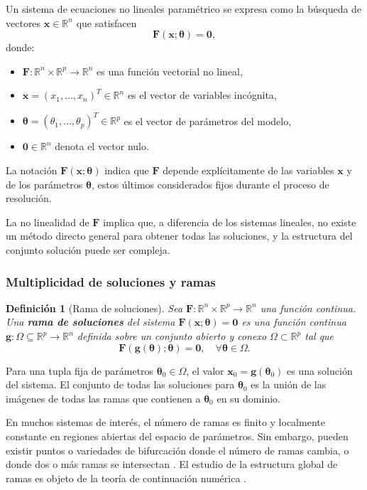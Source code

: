 \documentclass[12pt,a4paper]{article}
\newtheorem{definition}{Definición}
\newcommand{\xvec}{\mathbf{x}}
\newcommand{\thetavec}{\boldsymbol{\theta}}
\newcommand{\Fvec}{\mathbf{F}}
\newcommand{\R}{\mathbb{R}}
\begin{document}
Un sistema de ecuaciones no lineales paramétrico se expresa como la búsqueda de vectores \(\xvec \in \R^n\) que satisfacen
\begin{equation}
    \Fvec(\xvec; \thetavec) = \mathbf{0},
    \label{eq:sistema_general}
\end{equation}
donde:
\begin{itemize}
    \item \(\Fvec: \R^n \times \R^p \to \R^n\) es una función vectorial no lineal,
    \item \(\xvec = (x_1, \dots, x_n)^T \in \R^n\) es el vector de variables incógnita,
    \item \(\thetavec = (\theta_1, \dots, \theta_p)^T \in \R^p\) es el vector de parámetros del modelo,
    \item \(\mathbf{0} \in \R^n\) denota el vector nulo.
\end{itemize}
La notación \(\Fvec(\xvec; \thetavec)\) indica que \(\Fvec\) depende explícitamente de las variables \(\xvec\) y de los parámetros \(\thetavec\), estos últimos considerados fijos durante el proceso de resolución.

La no linealidad de \(\Fvec\) implica que, a diferencia de los sistemas lineales, no existe un método directo general para obtener todas las soluciones, y la estructura del conjunto solución puede ser compleja.

\subsubsection*{Multiplicidad de soluciones y ramas}

\begin{definition}[Rama de soluciones]
Sea \(\Fvec: \R^n \times \R^p \to \R^n\) una función continua. Una \textbf{rama de soluciones} del sistema \(\Fvec(\xvec; \thetavec) = \mathbf{0}\) es una función continua \(\mathbf{g}: \Omega \subseteq \R^p \to \R^n\) definida sobre un conjunto abierto y conexo \(\Omega \subset \R^p\) tal que
\[
\Fvec(\mathbf{g}(\thetavec); \thetavec) = \mathbf{0}, \quad \forall \thetavec \in \Omega.
\]
\end{definition}

Para una tupla fija de parámetros \(\thetavec_0 \in \Omega\), el valor \(\xvec_0 = \mathbf{g}(\thetavec_0)\) es una solución del sistema. El conjunto de todas las soluciones para \(\thetavec_0\) es la unión de las imágenes de todas las ramas que contienen a \(\thetavec_0\) en su dominio.

En muchos sistemas de interés, el número de ramas es finito y localmente constante en regiones abiertas del espacio de parámetros. Sin embargo, pueden existir puntos o variedades de bifurcación donde el número de ramas cambia, o donde dos o más ramas se intersectan \cite{allgower1990numerical}. El estudio de la estructura global de ramas es objeto de la teoría de continuación numérica \cite{doedel2007numerical}.
\end{document}
